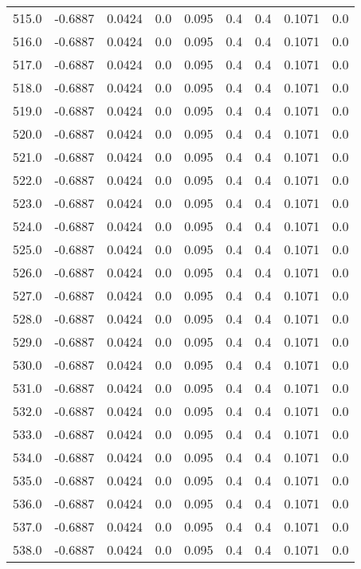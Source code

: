 \begin{longtable}{lrrrrrrrr}
515.0 & -0.6887 & 0.0424 & 0.0 & 0.095 & 0.4 & 0.4 & 0.1071 & 0.0 \\
516.0 & -0.6887 & 0.0424 & 0.0 & 0.095 & 0.4 & 0.4 & 0.1071 & 0.0 \\
517.0 & -0.6887 & 0.0424 & 0.0 & 0.095 & 0.4 & 0.4 & 0.1071 & 0.0 \\
518.0 & -0.6887 & 0.0424 & 0.0 & 0.095 & 0.4 & 0.4 & 0.1071 & 0.0 \\
519.0 & -0.6887 & 0.0424 & 0.0 & 0.095 & 0.4 & 0.4 & 0.1071 & 0.0 \\
520.0 & -0.6887 & 0.0424 & 0.0 & 0.095 & 0.4 & 0.4 & 0.1071 & 0.0 \\
521.0 & -0.6887 & 0.0424 & 0.0 & 0.095 & 0.4 & 0.4 & 0.1071 & 0.0 \\
522.0 & -0.6887 & 0.0424 & 0.0 & 0.095 & 0.4 & 0.4 & 0.1071 & 0.0 \\
523.0 & -0.6887 & 0.0424 & 0.0 & 0.095 & 0.4 & 0.4 & 0.1071 & 0.0 \\
524.0 & -0.6887 & 0.0424 & 0.0 & 0.095 & 0.4 & 0.4 & 0.1071 & 0.0 \\
525.0 & -0.6887 & 0.0424 & 0.0 & 0.095 & 0.4 & 0.4 & 0.1071 & 0.0 \\
526.0 & -0.6887 & 0.0424 & 0.0 & 0.095 & 0.4 & 0.4 & 0.1071 & 0.0 \\
527.0 & -0.6887 & 0.0424 & 0.0 & 0.095 & 0.4 & 0.4 & 0.1071 & 0.0 \\
528.0 & -0.6887 & 0.0424 & 0.0 & 0.095 & 0.4 & 0.4 & 0.1071 & 0.0 \\
529.0 & -0.6887 & 0.0424 & 0.0 & 0.095 & 0.4 & 0.4 & 0.1071 & 0.0 \\
530.0 & -0.6887 & 0.0424 & 0.0 & 0.095 & 0.4 & 0.4 & 0.1071 & 0.0 \\
531.0 & -0.6887 & 0.0424 & 0.0 & 0.095 & 0.4 & 0.4 & 0.1071 & 0.0 \\
532.0 & -0.6887 & 0.0424 & 0.0 & 0.095 & 0.4 & 0.4 & 0.1071 & 0.0 \\
533.0 & -0.6887 & 0.0424 & 0.0 & 0.095 & 0.4 & 0.4 & 0.1071 & 0.0 \\
534.0 & -0.6887 & 0.0424 & 0.0 & 0.095 & 0.4 & 0.4 & 0.1071 & 0.0 \\
535.0 & -0.6887 & 0.0424 & 0.0 & 0.095 & 0.4 & 0.4 & 0.1071 & 0.0 \\
536.0 & -0.6887 & 0.0424 & 0.0 & 0.095 & 0.4 & 0.4 & 0.1071 & 0.0 \\
537.0 & -0.6887 & 0.0424 & 0.0 & 0.095 & 0.4 & 0.4 & 0.1071 & 0.0 \\
538.0 & -0.6887 & 0.0424 & 0.0 & 0.095 & 0.4 & 0.4 & 0.1071 & 0.0 \\

\end{longtable}
